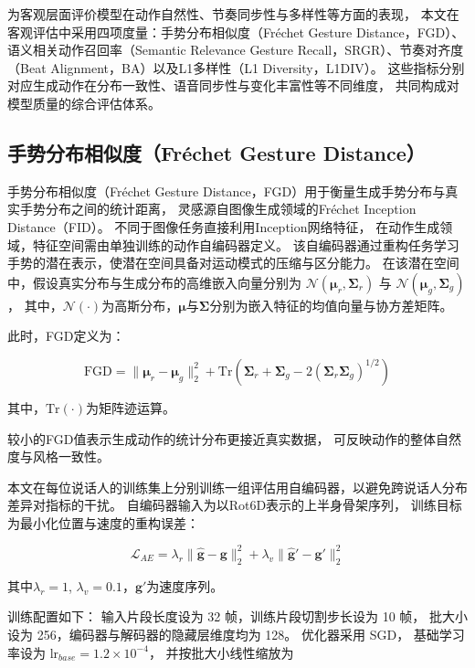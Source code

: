 为客观层面评价模型在动作自然性、节奏同步性与多样性等方面的表现，
本文在客观评估中采用四项度量：手势分布相似度（Fréchet Gesture Distance，FGD）\cite{speech_gesture_generation}、语义相关动作召回率（Semantic Relevance Gesture Recall，SRGR）\cite{beatcamn}、节奏对齐度（Beat Alignment，BA）\cite{beatcamn, beatalign}以及L1多样性（L1 Diversity，L1DIV）。
这些指标分别对应生成动作在分布一致性、语音同步性与变化丰富性等不同维度，
共同构成对模型质量的综合评估体系。

\subsection{手势分布相似度（Fréchet Gesture Distance）}
\label{subsec:fgd}

手势分布相似度（Fréchet Gesture Distance，FGD）\cite{speech_gesture_generation}用于衡量生成手势分布与真实手势分布之间的统计距离，
灵感源自图像生成领域的Fréchet Inception Distance（FID）\cite{fid}。
不同于图像任务直接利用Inception网络特征，
在动作生成领域，特征空间需由单独训练的动作自编码器定义。
该自编码器通过重构任务学习手势的潜在表示，使潜在空间具备对运动模式的压缩与区分能力。
在该潜在空间中，假设真实分布与生成分布的高维嵌入向量分别为
$\mathcal{N}(\bm{\mu}_r, \bm{\Sigma}_r)$ 与 $\mathcal{N}(\bm{\mu}_g, \bm{\Sigma}_g)$，
其中，$\mathcal{N}(\cdot)$为高斯分布，$\bm{\mu}$与$\bm{\Sigma}$分别为嵌入特征的均值向量与协方差矩阵。

此时，FGD定义为：

\begin{equation}
\mathrm{FGD} = 
\|\bm{\mu}_r - \bm{\mu}_g\|_2^2 +
\mathrm{Tr}(\bm{\Sigma}_r + \bm{\Sigma}_g - 2(\bm{\Sigma}_r \bm{\Sigma}_g)^{1/2})
\end{equation}

其中，$\mathrm{Tr}(\cdot)$为矩阵迹运算。

较小的FGD值表示生成动作的统计分布更接近真实数据，
可反映动作的整体自然度与风格一致性。

本文在每位说话人的训练集上分别训练一组评估用自编码器，以避免跨说话人分布差异对指标的干扰。
自编码器输入为以Rot6D表示的上半身骨架序列，
训练目标为最小化位置与速度的重构误差：

\begin{equation}
\mathcal{L}_{AE} = 
\lambda_r \|\hat{\bm{g}} - \bm{g}\|_2^2 +
\lambda_v \|\hat{\bm{g}}' - \bm{g}'\|_2^2
\label{eq:fgd_ae_loss}
\end{equation}

其中$\lambda_r = 1$, $\lambda_v = 0.1$，$\bm{g}'$为速度序列。

训练配置如下：
输入片段长度设为 32 帧，训练片段切割步长设为 10 帧，
批大小设为 256，编码器与解码器的隐藏层维度均为 128。
优化器采用 SGD\cite{SGDBottou2010LargeScaleML}，
基础学习率设为 $\mathrm{lr}_{base}=1.2\times 10^{-4}$，
并按批大小线性缩放为

